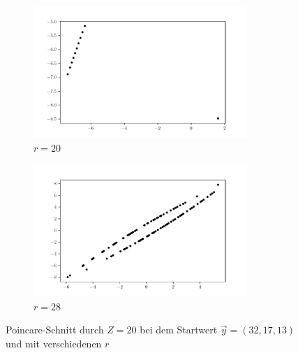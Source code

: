 \begin{figure}
    \begin{subfigure}{0.48\textwidth}
        \centering
        \includegraphics[height = 5cm]{build/z20_20.pdf}
        \caption{$r = 20$}
    \end{subfigure}
    \hfill
    \begin{subfigure}{0.48\textwidth}
        \centering
        \includegraphics[height = 5cm]{build/z20_28.pdf}
        \caption{$r = 28$}
    \end{subfigure}
    \caption{Poincare-Schnitt durch $Z = 20$ bei dem Startwert $\vec{y} = (32, 17, 13)$ und mit verschiedenen $r$}
    \label{fig:2d}
\end{figure}
